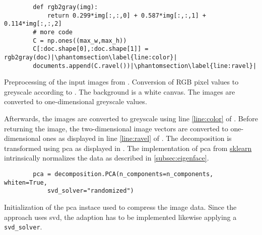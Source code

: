 \begin{listing}[htp]
    \begin{verbatim}
        def rgb2gray(img):
            return 0.299*img[:,:,0] + 0.587*img[:,:,1] + 0.114*img[:,:,2]
        # more code
        C = np.ones((max_w,max_h))
        C[:doc.shape[0],:doc.shape[1]] = rgb2gray(doc)|\phantomsection\label{line:color}|
        documents.append(C.ravel())|\phantomsection\label{line:ravel}|
    \end{verbatim}
    \caption[Preprocessing of the input images]{Preprocessing of the input images from \thesissupervisor{}.
    Conversion of RGB pixel values to greyscale according to \cite{RGB2Grey}.
    The background is a white canvas.
    The images are converted to one-dimensional greyscale values.}
    \label{lst:preproc_images}
\end{listing}

Afterwards, the images are converted to greyscale using line \ref{line:color} of .
Before returning the image, the two-dimensional image vectors are converted to one-dimensional ones as displayed in line \ref{line:ravel} of .
The decomposition is transformed using \ac{pca} as displayed in .
The implementation of \ac{pca} from \href{https://scikit-learn.org/stable/modules/generated/sklearn.decomposition.PCA.html}{sklearn} 
intrinsically normalizes the data as described in \autoref{subsec:eigenface}.%

\begin{listing}[htp]
    \begin{verbatim}
        pca = decomposition.PCA(n_components=n_components, whiten=True, 
            svd_solver="randomized")
    \end{verbatim}
    \caption[Initialization of the \ac{pca} instace]{Initialization of the \ac{pca} instace used to compress the image data.
    Since the \eigenfaces{} approach uses \ac{svd}, the adaption \eigendocs{} has to be implemented likewise applying a \texttt{svd\_solver}.
    }
    \label{lst:pca_svd}
\end{listing}


